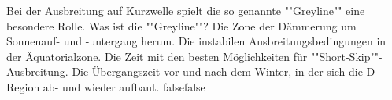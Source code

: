     {Bei der Ausbreitung auf Kurzwelle spielt die so genannte ""Greyline"" eine besondere Rolle. Was ist die ""Greyline""?}
    {Die Zone der Dämmerung um Sonnenauf- und -untergang herum.}
    {Die instabilen Ausbreitungsbedingungen in der Äquatorialzone.}
    {Die Zeit mit den besten Möglichkeiten für ""Short-Skip""-Ausbreitung.}
    {Die Übergangszeit vor und nach dem Winter, in der sich die D-Region ab- und wieder aufbaut.}
    {false}{false}